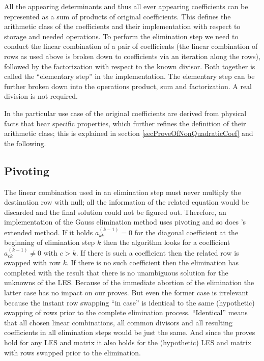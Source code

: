 All the appearing determinants and thus all ever appearing coefficients
can be represented as a sum of products of original coefficients. This
defines the arithmetic class of the coefficients and their implementation
with respect to storage and needed operations. To perform the elimination
step we need to conduct the linear combination of a pair of coefficients
(the linear combination of rows as used above is broken down to
coefficients via an iteration along the rows), followed by the
factorization with respect to the known divisor. Both together is called
the ``elementary step'' in the implementation. The elementary step can be
further broken down into the operations product, sum and factorization. A
real division is not required.

In the particular use case of \linnet{} the original coefficients are
derived from physical facts that bear specific properties, which further
refines the definition of their arithmetic class; this is explained in
section \ref{secProveOfNonQuadraticCoef} and the following.


\subsection{Pivoting}

The linear combination used in an elimination step must never multiply the
destination row with null; all the information of the related equation
would be discarded and the final solution could not be figured out.
Therefore, an implementation of the Gauss elimination method uses pivoting
and so does \linnet{}'s extended method. If it holds $a^{(k-1)}_{kk} = 0$
for the diagonal coefficient at the beginning of elimination step $k$ then
the algorithm looks for a coefficient $a^{(k-1)}_{ck} \neq 0$ with $c >
k$. If there is such a coefficient then the related row is swapped with
row $k$. If there is no such coefficient then the elimination has
completed with the result that there is no unambiguous solution for the
unknowns of the LES. Because of the immediate abortion of the elimination
the latter case has no impact on our proves. But even the former case is
irrelevant because the instant row swapping ``in case'' is identical to
the same (hypothetic) swapping of rows prior to the complete elimination
process. ``Identical'' means that all chosen linear combinations, all
common divisors and all resulting coefficients in all elimination
steps would be just the same. And since the proves hold for any LES and
matrix it also holds for the (hypothetic) LES and matrix with rows
swapped prior to the elimination.


